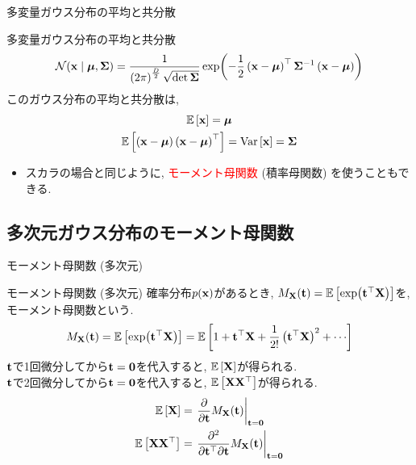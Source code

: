 \documentclass[dvipdfmx,notheorems,t]{beamer}
\begin{document}
\begin{frame}{多変量ガウス分布の平均と共分散}
\begin{block}{多変量ガウス分布の平均と共分散}
  \begin{align*}
    \mathcal{N}(\vb{x} \mid \vb*{\mu}, \vb{\Sigma})
    = \frac{1}{\left( 2\pi \right)^\frac{D}{2} \sqrt{\det \vb{\Sigma}}}
    \exp(-\frac{1}{2} \left( \vb{x} - \vb*{\mu} \right)^\top \vb{\Sigma}^{-1}
      \left( \vb{x} - \vb*{\mu} \right))
  \end{align*}
  このガウス分布の平均と共分散は,
  \begin{gather*}
    \operatorname{\mathbb{E}} \left[ \vb{x} \right] = \vb*{\mu} \\
    \operatorname{\mathbb{E}} \left[ \left( \vb{x} - \vb*{\mu} \right) \left( \vb{x} - \vb*{\mu} \right)^\top \right]
      = \operatorname{Var} \left[ \vb{x} \right] = \vb{\Sigma}
  \end{gather*}
\end{block}

\begin{itemize}
  \item スカラの場合と同じように, \textcolor{red}{モーメント母関数} (積率母関数) を使うこともできる.
\end{itemize}
\end{frame}

\subsection{多次元ガウス分布のモーメント母関数}

\begin{frame}{モーメント母関数 (多次元)}
\begin{block}{モーメント母関数 (多次元)}
  確率分布$p(\vb{x})$があるとき, $M_{\vb{X}}(\vb{t}) = \operatorname{\mathbb{E}} \left[ \exp(\vb{t}^\top \vb{X}) \right]$を, モーメント母関数という.
  \begin{align*}
    M_{\vb{X}}(\vb{t}) = \E{\exp(\vb{t}^\top \vb{X})} = \E{1 + \vb{t}^\top \vb{X}
      + \frac{1}{2!} \left( \vb{t}^\top \vb{X} \right)^2 + \cdots}
  \end{align*}
  $\vb{t}$で1回微分してから$\vb{t} = \vb{0}$を代入すると, $\operatorname{\mathbb{E}} \left[ \vb{X} \right]$が得られる. \\
  $\vb{t}$で2回微分してから$\vb{t} = \vb{0}$を代入すると, $\operatorname{\mathbb{E}} \left[ \vb{X} \vb{X}^\top \right]$が得られる.
  \begin{align*}
    \operatorname{\mathbb{E}} \left[ \vb{X} \right] &= \left. \pdv{\vb{t}}
      M_{\vb{X}}(\vb{t}) \right|_{\vb{t} = \vb{0}} \\
    \operatorname{\mathbb{E}} \left[ \vb{X} \vb{X}^\top \right] &= \left. \frac{\partial^2}{\partial \vb{t}^\top \partial \vb{t}}
      M_{\vb{X}}(\vb{t}) \right|_{\vb{t} = \vb{0}}
  \end{align*}
\end{block}
\end{frame}
\end{document}

